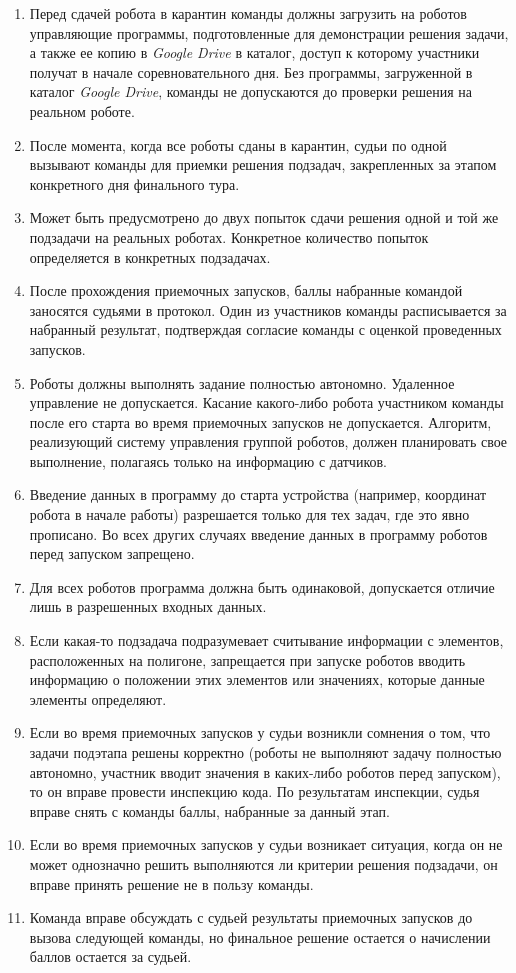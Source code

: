 \begin{enumerate}
    \item Перед сдачей робота в карантин команды должны загрузить на роботов управляющие
            программы, подготовленные для демонстрации решения задачи, а также ее копию в
            \textit{Google Drive} в каталог, доступ к которому участники получат в начале соревновательного дня.
            Без программы, загруженной в каталог \textit{Google Drive}, команды
            не допускаются до проверки решения на реальном роботе.
    \item После момента, когда все роботы сданы в карантин, судьи по одной вызывают команды
            для приемки решения подзадач, закрепленных за этапом конкретного дня финального тура.
    \item Может быть предусмотрено до двух попыток сдачи решения одной и той же подзадачи на
            реальных роботах. Конкретное количество попыток определяется в конкретных подзадачах.
    \item После прохождения приемочных запусков, баллы набранные командой заносятся судьями в протокол.
            Один из участников команды расписывается за набранный результат, подтверждая согласие команды с оценкой проведенных запусков.
    \item Роботы должны выполнять задание полностью автономно. Удаленное управление не допускается.
            Касание какого-либо робота участником команды после его старта во время приемочных запусков не допускается.
            Алгоритм, реализующий систему управления группой роботов, должен планировать свое выполнение, полагаясь только на информацию с датчиков.
    \item Введение данных в программу до старта устройства (например, координат робота в начале работы) разрешается только
            для тех задач, где это явно прописано. Во всех других случаях введение данных в программу роботов перед запуском запрещено.
    \item Для всех роботов программа должна быть одинаковой, допускается отличие лишь в разрешенных входных данных.
    \item Если какая-то подзадача подразумевает считывание информации с элементов, расположенных на полигоне,
            запрещается при запуске роботов вводить информацию о положении этих элементов или значениях, которые данные элементы определяют.
    \item Если во время приемочных запусков у судьи возникли сомнения о том, что задачи подэтапа решены корректно
            (роботы не выполняют задачу полностью автономно, участник вводит значения в каких-либо роботов перед запуском),
            то он вправе провести инспекцию кода. По результатам инспекции, судья вправе снять с команды баллы, набранные за данный этап.
    \item Если во время приемочных запусков у судьи возникает ситуация, когда он не может однозначно решить
            выполняются ли критерии решения подзадачи, он вправе принять решение не в пользу команды.
    \item Команда вправе обсуждать с судьей результаты приемочных запусков до вызова следующей команды,
            но финальное решение остается о начислении баллов остается за судьей.
\end{enumerate}